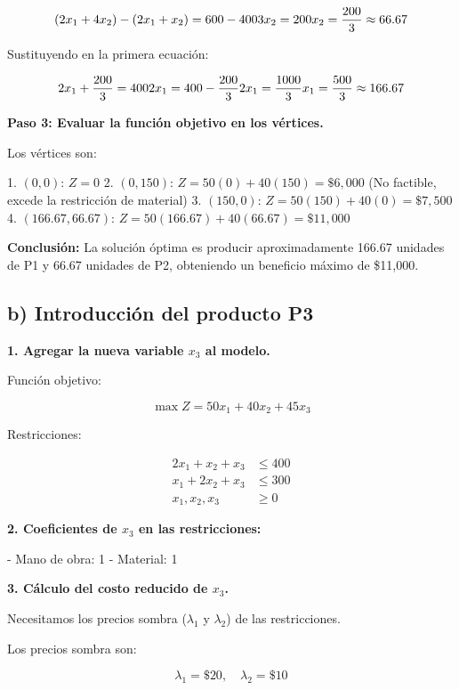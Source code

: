 \documentclass{article}
\begin{document}
\[
(2x_1 + 4x_2) - (2x_1 + x_2) = 600 - 400 \\
3x_2 = 200 \\
x_2 = \frac{200}{3} \approx 66.67
\]

Sustituyendo en la primera ecuación:

\[
2x_1 + \frac{200}{3} = 400 \\
2x_1 = 400 - \frac{200}{3} \\
2x_1 = \frac{1000}{3} \\
x_1 = \frac{500}{3} \approx 166.67
\]

\textbf{Paso 3: Evaluar la función objetivo en los vértices.}

Los vértices son:

1. \( (0, 0) \): \( Z = 0 \)
2. \( (0, 150) \): \( Z = 50(0) + 40(150) = \$6,000 \) (No factible, excede la restricción de material)
3. \( (150, 0) \): \( Z = 50(150) + 40(0) = \$7,500 \)
4. \( (166.67, 66.67) \): \( Z = 50(166.67) + 40(66.67) = \$11,000 \)

\textbf{Conclusión:} La solución óptima es producir aproximadamente 166.67 unidades de P1 y 66.67 unidades de P2, obteniendo un beneficio máximo de \$11,000.

\subsection*{b) Introducción del producto P3}

\textbf{1. Agregar la nueva variable \( x_3 \) al modelo.}

Función objetivo:

\[
\max Z = 50x_1 + 40x_2 + 45x_3
\]

Restricciones:

\[
\begin{aligned}
2x_1 + x_2 + x_3 &\leq 400 \\
x_1 + 2x_2 + x_3 &\leq 300 \\
x_1, x_2, x_3 &\geq 0
\end{aligned}
\]

\textbf{2. Coeficientes de \( x_3 \) en las restricciones:}

- Mano de obra: 1
- Material: 1

\textbf{3. Cálculo del costo reducido de \( x_3 \).}

Necesitamos los precios sombra (\( \lambda_1 \) y \( \lambda_2 \)) de las restricciones.

Los precios sombra son:

\[
\lambda_1 = \$20, \quad \lambda_2 = \$10
\]
\end{document}
